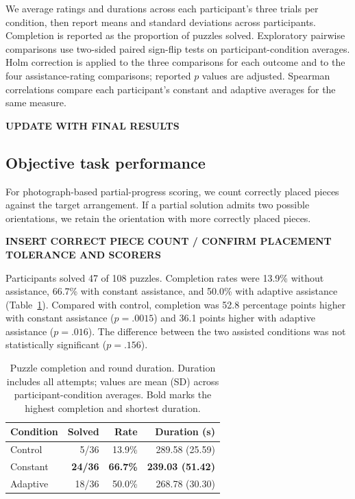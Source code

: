 \documentclass[sigconf,anonymous]{aamas}
\begin{document}
We average ratings and durations across each participant's three trials per condition, then report means and standard deviations across participants. Completion is reported as the proportion of puzzles solved. Exploratory pairwise comparisons use two-sided paired sign-flip tests on participant-condition averages. Holm correction is applied to the three comparisons for each outcome and to the four assistance-rating comparisons; reported $p$ values are adjusted. Spearman correlations compare each participant’s constant and adaptive averages for the same measure.

\textbf{UPDATE WITH FINAL RESULTS}

\subsection{Objective task performance}

For photograph-based partial-progress scoring, we count correctly placed pieces against the target arrangement. If a partial solution admits two possible orientations, we retain the orientation with more correctly placed pieces.

\textbf{INSERT CORRECT PIECE COUNT / CONFIRM PLACEMENT TOLERANCE AND SCORERS}

Participants solved 47 of 108 puzzles. Completion rates were 13.9\% without assistance, 66.7\% with constant assistance, and 50.0\% with adaptive assistance (Table~\ref{tab:performance}). Compared with control, completion was 52.8 percentage points higher with constant assistance ($p=.0015$) and 36.1 points higher with adaptive assistance ($p=.016$). The difference between the two assisted conditions was not statistically significant ($p=.156$).

\begin{table}[t]
\centering
\caption{Puzzle completion and round duration. Duration includes all attempts; values are mean (SD) across participant-condition averages. Bold marks the highest completion and shortest duration.}
\label{tab:performance}
\begin{tabular}{lrrr}
\toprule
Condition & Solved & Rate & Duration (s) \\
\midrule
Control & 5/36 & 13.9\% & 289.58 (25.59) \\
Constant & \textbf{24/36} & \textbf{66.7\%} & \textbf{239.03 (51.42)} \\
Adaptive & 18/36 & 50.0\% & 268.78 (30.30) \\
\bottomrule
\end{tabular}
\end{table}
\end{document}
